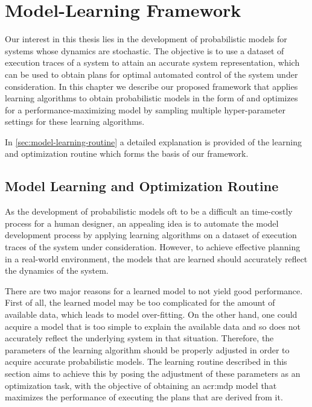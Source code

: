 \chapter{Model-Learning Framework}
\label{ch:methodology} %

Our interest in this thesis lies in the development of probabilistic models for systems whose dynamics are stochastic.
The objective is to use a dataset of execution traces of a system to attain an accurate system representation, which can be used to obtain plans for optimal automated control of the system under consideration.
In this chapter we describe our proposed framework that applies learning algorithms to obtain probabilistic models in the form of  and optimizes for a performance-maximizing model by sampling multiple hyper-parameter settings for these learning algorithms.

In \autoref{sec:model-learning-routine} a detailed explanation is provided of the learning and optimization routine which forms the basis of our framework.

\section{Model Learning and Optimization Routine}
\label{sec:model-learning-routine}

As the development of probabilistic models oft to be a difficult an time-costly process for a human designer, an appealing idea is to automate the model development process by applying learning algorithms on a dataset of execution traces of the system under consideration.
However, to achieve effective planning in a real-world environment, the models that are learned should accurately reflect the dynamics of the system.

There are two major reasons for a learned model to not yield good performance.
First of all, the learned model may be too complicated for the amount of available data, which leads to model over-fitting.
On the other hand, one could acquire a model that is too simple to explain the available data and so does not accurately reflect the underlying system in that situation.
Therefore, the parameters of the learning algorithm should be properly adjusted in order to acquire accurate probabilistic models.
The learning routine described in this section aims to achieve this by posing the adjustment of these parameters as an optimization task, with the objective of obtaining an \acrshort{acr:mdp} model that maximizes the performance of executing the plans that are derived from it.

